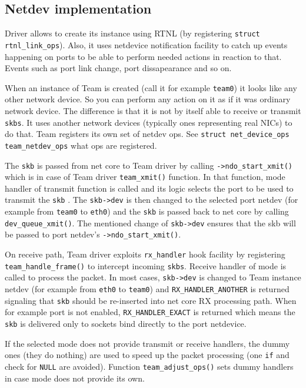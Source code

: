 \documentclass[11pt,a4paper]{article}
\begin{document}
\subsection{Netdev implementation}

Driver allows to create its instance using RTNL (by registering \verb+struct rtnl_link_ops+). Also, it uses netdevice notification facility to catch up events happening on ports to be able to perform needed actions in reaction to that. Events such as port link change, port dissapearance and so on.

When an instance of Team is created (call it for example \verb+team0+) it looks like any other network device. So you can perform any action on it as if it was ordinary network device. The difference is that it is not by itself able to receive or transmit \verb+skbs+. It uses another network devices (typically ones representing real NICs) to do that. Team registers its own set of netdev ops. See \verb+struct net_device_ops team_netdev_ops+ what ops are registered.

The \verb+skb+ is passed from net core to Team driver by calling \verb+->ndo_start_xmit()+ which is in case of Team driver \verb+team_xmit()+ function. In that function, mode handler of transmit function is called and its logic selects the port to be used to transmit the \verb+skb+ . The \verb+skb->dev+ is then changed to the selected port netdev (for example from \verb+team0+ to \verb+eth0+) and the \verb+skb+ is passed back to net core by calling \verb+dev_queue_xmit()+. The mentioned change of \verb+skb->dev+ ensures that the skb will be passed to port netdev's \verb+->ndo_start_xmit()+.

On receive path, Team driver exploits \verb+rx_handler+ hook facility by registering \verb+team_handle_frame()+ to intercept incoming \verb+skbs+. Receive handler of mode is called to process the packet. In most cases, \verb+skb->dev+ is changed to Team instance netdev (for example from \verb+eth0+ to \verb+team0+) and \verb+RX_HANDLER_ANOTHER+ is returned signaling that \verb+skb+ should be re-inserted into net core RX processing path. When for example port is not enabled, \verb+RX_HANDLER_EXACT+ is returned which means the \verb+skb+ is delivered only to sockets bind directly to the port netdevice.

If the selected mode does not provide transmit or receive handlers, the dummy ones (they do nothing) are used to speed up the packet processing (one \verb+if+ and check for \verb+NULL+ are avoided). Function \verb+team_adjust_ops()+ sets dummy handlers in case mode does not provide its own.
\end{document}
